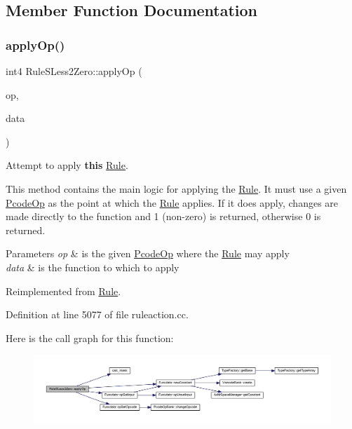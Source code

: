 \subsection{Member Function Documentation}
\mbox{\label{class_rule_s_less2_zero_aee3dc812afcd3baeef9d3995971c098a}} 
\subsubsection{\texorpdfstring{applyOp()}{applyOp()}}
{\footnotesize\ttfamily int4 Rule\+S\+Less2\+Zero\+::apply\+Op (\begin{DoxyParamCaption}\item[{\mbox{\hyperlink{class_pcode_op}{Pcode\+Op}} $\ast$}]{op,  }\item[{\mbox{\hyperlink{class_funcdata}{Funcdata}} \&}]{data }\end{DoxyParamCaption})\hspace{0.3cm}{\ttfamily [virtual]}}



Attempt to apply {\bfseries{this}} \mbox{\hyperlink{class_rule}{Rule}}. 

This method contains the main logic for applying the \mbox{\hyperlink{class_rule}{Rule}}. It must use a given \mbox{\hyperlink{class_pcode_op}{Pcode\+Op}} as the point at which the \mbox{\hyperlink{class_rule}{Rule}} applies. If it does apply, changes are made directly to the function and 1 (non-\/zero) is returned, otherwise 0 is returned. 
\begin{DoxyParams}{Parameters}
{\em op} & is the given \mbox{\hyperlink{class_pcode_op}{Pcode\+Op}} where the \mbox{\hyperlink{class_rule}{Rule}} may apply \\
\hline
{\em data} & is the function to which to apply \\
\hline
\end{DoxyParams}


Reimplemented from \mbox{\hyperlink{class_rule_a4e3e61f066670175009f60fb9dc60848}{Rule}}.



Definition at line 5077 of file ruleaction.\+cc.

Here is the call graph for this function\+:
\nopagebreak
\begin{figure}[H]
\begin{center}
\leavevmode
\includegraphics[width=350pt]{class_rule_s_less2_zero_aee3dc812afcd3baeef9d3995971c098a_cgraph}
\end{center}
\end{figure}
\mbox{\label{class_rule_s_less2_zero_a8a7902b27cde82499a427eaf8d0e5dde}} 
